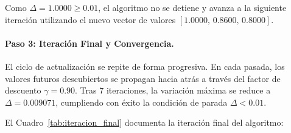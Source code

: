 Como $\Delta = 1.0000 \ge 0.01$, el algoritmo no se detiene y avanza a la siguiente iteración utilizando el nuevo vector de valores $[1.0000, \, 0.8600, \, 0.8000]$.

\paragraph{Paso 3: Iteración Final y Convergencia.}
El ciclo de actualización se repite de forma progresiva. En cada pasada, los valores futuros descubiertos se propagan hacia atrás a través del factor de descuento $\gamma = 0.90$. Tras 7 iteraciones, la variación máxima se reduce a $\Delta = 0.009071$, cumpliendo con éxito la condición de parada $\Delta < 0.01$.

El Cuadro~\ref{tab:iteracion_final} documenta la iteración final del algoritmo:

